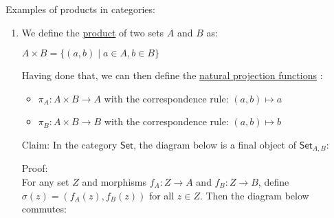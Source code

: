 \documentclass{book}
\newcommand{\exOne}{%
   \color{Purple}%
   \fontsize{14}{16}\selectfont%
}
\newcommand{\exTwo}{%
   \color{RedViolet}%
   \fontsize{13}{15}\selectfont%
}
\newenvironment{myIndent}{%
   \begin{adjustwidth}{2.5em}{0em}%
}{%
   \end{adjustwidth}%
}
\newcommand{\udefine}[1]{{%
   \setulcolor{Red}%
   \setul{0.14em}{0.07em}%
   \ul{#1}%
}}
\newcommand{\mcateg}[1]{{\bm{\mathsf{#1}}}}
\newcommand{\retTwo}{\hfill\bigbreak}
\begin{document}
\newpage
\exOne
Examples of products in categories:
\begin{enumerate}
   \item We define the \udefine{product} of two sets $A$ and $B$ as:

   {\centering $A \times B = \{(a, b) \mid a \in A, b \in B\} $ \retTwo\par}

   Having done that, we can then define the \udefine{natural projection functions}:
   \begin{itemize}
      \item $\pi_A: A \times B \longrightarrow A$ with the correspondence rule: $(a, b) \mapsto a$
      \item $\pi_B: A \times B \longrightarrow B$ with the correspondence rule: $(a, b) \mapsto b$\retTwo
   \end{itemize}

   Claim: In the category $\mcateg{Set}$, the diagram below is a final object of $\mcateg{Set}_{A,B}$:
   
   {\centering %
   \par}
   
   {\begin{myIndent} \exTwo
      Proof:\\
      For any set $Z$ and morphisms $f_A: Z \longrightarrow A$ and $f_B: Z \longrightarrow B$, define\\ $\sigma(z) = (f_A(z), f_B(z))$ for all $z \in Z$. Then the diagram below commutes:

      {\center
      \par}


\end{myIndent}}
\end{enumerate}
\end{document}
